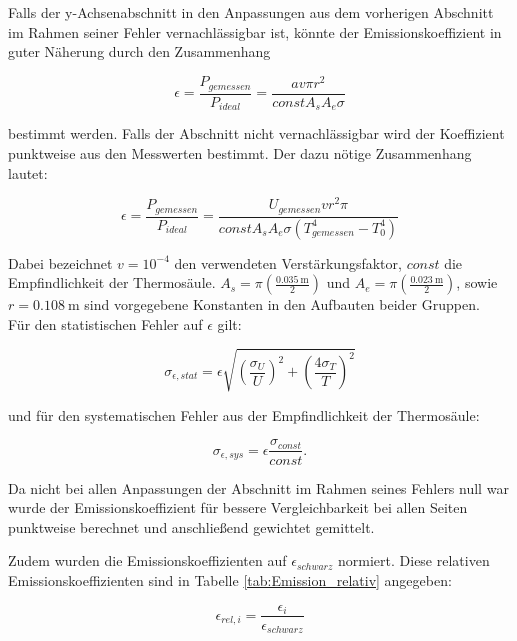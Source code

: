 \documentclass[12pt,a4paper]{article}
\begin{document}
Falls der y-Achsenabschnitt in den Anpassungen aus dem vorherigen Abschnitt im Rahmen seiner Fehler vernachlässigbar ist, könnte der Emissionskoeffizient in guter Näherung durch den Zusammenhang

\begin{equation}
\epsilon = \frac{P_{gemessen}}{P_{ideal}} = \frac{a v \pi r^2}{const A_s A_e \sigma}
\end{equation}

bestimmt werden. Falls der Abschnitt nicht vernachlässigbar wird 
der Koeffizient punktweise aus den Messwerten bestimmt. Der dazu nötige Zusammenhang lautet:

\begin{equation}
\epsilon = \frac{P_{gemessen}}{P_{ideal}} = \frac{U_{gemessen}vr^2 \pi}{const A_s A_e \sigma (T_{gemessen}^4-T_0^4)}
\end{equation}

Dabei bezeichnet $v = 10^{-4}$ den verwendeten Verstärkungsfaktor, $const$ die Empfindlichkeit der Thermosäule. $A_s = \pi \left(\frac{\SI{0,035}{\m}}{2}\right)$ und $A_e = \pi \left(\frac{\SI{0,023}{\m}}{2}\right)$, sowie $r = \SI{0,108}{\m}$ sind vorgegebene Konstanten in den Aufbauten beider Gruppen.\\

Für den statistischen Fehler auf $\epsilon$ gilt:

\begin{equation}
\sigma_{\epsilon, stat} = \epsilon \sqrt{ \left(\frac{\sigma_U}{U}\right)^2 + \left(\frac{4 \sigma_T}{T}\right)^2}
\end{equation}

und für den systematischen Fehler aus der Empfindlichkeit der Thermosäule:

\begin{equation}
\sigma_{\epsilon, sys} = \epsilon \frac{\sigma_{const}}{const}.
\end{equation}

Da nicht bei allen Anpassungen der Abschnitt im Rahmen seines Fehlers null war wurde der Emissionskoeffizient für bessere Vergleichbarkeit bei allen Seiten punktweise berechnet und anschließend gewichtet gemittelt.

Zudem wurden die Emissionskoeffizienten auf $\epsilon_{schwarz}$ normiert. Diese relativen Emissionskoeffizienten sind in Tabelle \ref{tab:Emission_relativ} angegeben:

\begin{equation}
\epsilon_{rel, i} = \frac{\epsilon_i}{\epsilon_{schwarz}}
\end{equation}
\end{document}
